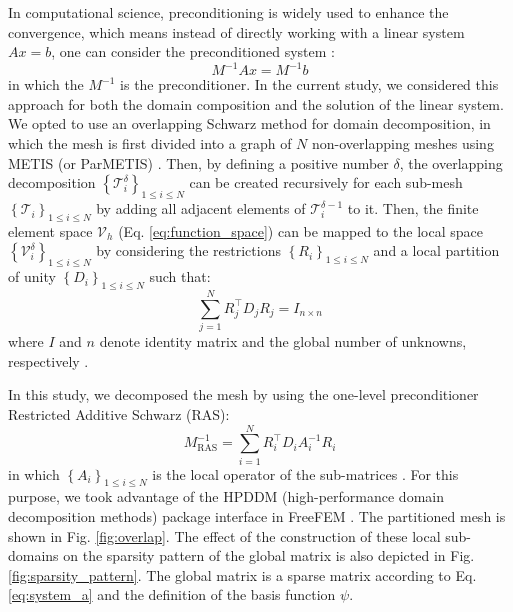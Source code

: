 In computational science, preconditioning is widely used to enhance the convergence, which means instead of directly working with a linear system $Ax=b$, one can consider the preconditioned system \cite{Daas2019AMS}:
\begin{equation} \label{eq:precond_system}
M^{-1} A x=M^{-1} b
\end{equation}
in which the $M^{-1}$ is the preconditioner. In the current study, we considered this approach for both the domain composition and the solution of the linear system. We opted to use an overlapping Schwarz method for domain decomposition, in which the mesh is first divided into a graph of $N$ non-overlapping meshes using METIS (or ParMETIS) \cite{METIS1998}. Then, by defining a positive number $\delta$, the overlapping decomposition $\left\{\mathcal{T}_{i}^{\delta}\right\}_{1 \leqslant i \leqslant N}$ can be created recursively for each sub-mesh $\left\{\mathcal{T}_{i}\right\}_{1 \leqslant i \leqslant N}$ by adding all adjacent elements of $\mathcal{T}_{i}^{\delta-1}$ to it. Then, the finite element space $\mathcal{V}_{h}$ (Eq. \ref{eq:function_space}) can be mapped to the local space $\left\{\mathcal{V}_{i}^{\delta}\right\}_{1 \leqslant i \leqslant N}$ by considering the restrictions $\left\{R_{i}\right\}_{1 \leqslant i \leqslant N}$ and a local partition of unity $\left\{D_{i}\right\}_{1 \leqslant i \leqslant N}$ such that:
\begin{equation} \label{eq:restrict}
\sum_{j=1}^{N} R_{j}^{\top} D_{j} R_{j}=I_{n \times n}
\end{equation}
where $I$ and $n$ denote identity matrix and the global number of unknowns, respectively \cite{Dolean2015}.

In this study, we decomposed the mesh by using the one-level preconditioner Restricted Additive Schwarz (RAS):
\begin{equation} \label{eq:ras}
M_{\mathrm{RAS}}^{-1}=\sum_{i=1}^{N} R_{i}^{\top} D_{i} A_{i}^{-1} R_{i}
\end{equation}
in which $\left\{A_{i}\right\}_{1 \leqslant i \leqslant N}$ is the local operator of the sub-matrices \cite{Dolean2015}. For this purpose, we took advantage of the {HPDDM} (high-performance domain decomposition methods) package interface in FreeFEM \cite{Jolivet2013}. The partitioned mesh is shown in Fig. \ref{fig:overlap}. The effect of the construction of these local sub-domains on the sparsity pattern of the global matrix is also depicted in Fig. \ref{fig:sparsity_pattern}. The global matrix is a sparse matrix according to Eq. \ref{eq:system_a} and the definition of the basis function $\psi$.

